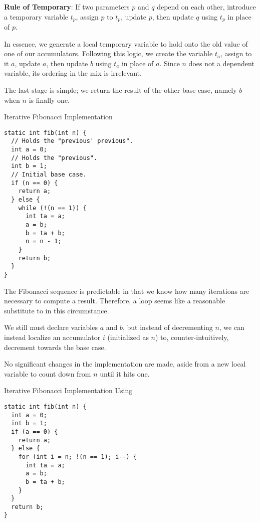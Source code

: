 \textbf{Rule of Temporary}: If two parameters $p$ and $q$ depend on each other, introduce a temporary variable $t_p$, assign $p$ to $t_p$, update $p$, then update $q$ using $t_p$ in place of $p$.

In essence, we generate a local temporary variable to hold onto the old value of one of our accumulators. Following this logic, we create the variable $t_a$, assign to it $a$, update $a$, then update $b$ using $t_a$ in place of $a$. Since $n$ does not a dependent variable, its ordering in the mix is irrelevant.

The last stage is simple; we return the result of the other base case, namely $b$ when $n$ is finally one.

\begin{cl}[]{Iterative Fibonacci Implementation}
\begin{lstlisting}[language=MyJava]
static int fib(int n) {
  // Holds the "previous' previous".
  int a = 0;
  // Holds the "previous".
  int b = 1;
  // Initial base case.
  if (n == 0) {
    return a;
  } else {
    while (!(n == 1)) {
      int ta = a;
      a = b;
      b = ta + b;
      n = n - 1;
    }
    return b;
  }
}
\end{lstlisting}
\end{cl}

The Fibonacci sequence is predictable in that we know how many iterations are necessary to compute a result. Therefore, a  loop seems like a reasonable substitute to  in this circumstance. 

We still must declare variables $a$ and $b$, but instead of decrementing $n$, we can instead localize an accumulator $i$ (initialized as $n$) to, counter-intuitively, decrement towards the base case. 

No significant changes in the implementation are made, aside from a new local variable to count down from $n$ until it hits one.

\begin{cl}[]{Iterative Fibonacci Implementation Using }
\begin{lstlisting}[language=MyJava]
static int fib(int n) {
  int a = 0;
  int b = 1;
  if (a == 0) {
    return a;
  } else {
    for (int i = n; !(n == 1); i--) {
      int ta = a;
      a = b;
      b = ta + b;
    }
  }
  return b;
}
\end{lstlisting}
\end{cl}

